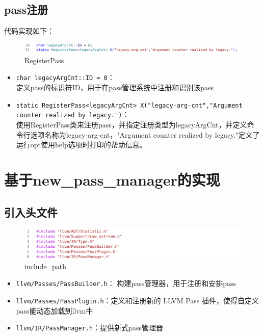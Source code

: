\documentclass[11pt, a4paper, oneside,UTF8]{ctexart}
\begin{document}
\subsection{pass注册}

代码实现如下：

\begin{figure}[h]
    \centering
    \includegraphics[width=1\textwidth]{./figure/legacy_3.png}
    \caption{RegisterPass}
    \label{figure:1.3}
\end{figure}

\begin{itemize}[before=]
    \setlength{\itemsep}{0em}
    \item \texttt{char legacyArgCnt::ID = 0}：\\定义pass的标识符ID，用于在pass管理系统中注册和识别该pass
    \item \texttt{static RegisterPass<legacyArgCnt> X("legacy-arg-cnt","Argument counter realized by legacy.")}：\\使用RegisterPass类来注册pass，并指定注册类型为legacyArgCnt，并定义命令行选项名称为legacy-arg-cnt，"Argument counter realized by legacy."定义了运行opt使用help选项时打印的帮助信息。
\end{itemize}

\section{基于new\_pass\_manager的实现}

\subsection{引入头文件}

\begin{figure}[h]
    \centering
    \includegraphics[width=1\textwidth]{./figure/new_1.png}
    \caption{include\_path}
    \label{figure:2.1}
\end{figure}

\begin{itemize}[before=]
    \setlength{\itemsep}{0em}
    \item \texttt{llvm/Passes/PassBuilder.h}： 构建pass管理器，用于注册和安排pass
    \item \texttt{llvm/Passes/PassPlugin.h}：定义和注册新的 LLVM Pass 插件，使得自定义pass能动态加载到llvm中
    \item \texttt{llvm/IR/PassManager.h}：提供新式pass管理器
\end{itemize}
\end{document}
